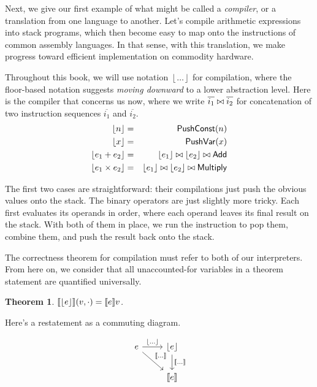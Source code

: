 \documentclass{amsbook}
\newtheorem{theorem}{Theorem}[chapter]
\theoremstyle{definition}
\theoremstyle{remark}
\numberwithin{section}{chapter}
\numberwithin{equation}{chapter}
\begin{document}
Next, we give our first example of what might be called a \emph{compiler}, or a translation from one language to another.
Let's compile arithmetic expressions into stack programs, which then become easy to map onto the instructions of common assembly languages.
In that sense, with this translation, we make progress toward efficient implementation on commodity hardware.

\newcommand{\compile}[1]{{\left \lfloor #1 \right \rfloor}}

Throughout this book, we will use notation $\compile{\ldots}$ for compilation, where the floor-based notation suggests \emph{moving downward} to a lower abstraction level.
Here is the compiler that concerns us now, where we write $\overline{i_1} \bowtie \overline{i_2}$ for concatenation of two instruction sequences $\overline{i_1}$ and $\overline{i_2}$.
\encoding
\begin{eqnarray*}
  \compile{n} &=& \mathsf{PushConst}(n) \\
  \compile{x} &=& \mathsf{PushVar}(x) \\
  \compile{e_1 + e_2} &=& \concat{\compile{e_1}}{\concat{\compile{e_2}}{\mathsf{Add}}} \\
  \compile{e_1 \times e_2} &=& \concat{\compile{e_1}}{\concat{\compile{e_2}}{\mathsf{Multiply}}}
\end{eqnarray*}

The first two cases are straightforward: their compilations just push the obvious values onto the stack.
The binary operators are just slightly more tricky.
Each first evaluates its operands in order, where each operand leaves its final result on the stack.
With both of them in place, we run the instruction to pop them, combine them, and push the result back onto the stack.

The correctness theorem for compilation must refer to both of our interpreters.
From here on, we consider that all unaccounted-for variables in a theorem statement are quantified universally.

\begin{theorem}
  $\denote{\compile{e}}(v, \cdot) = \denote{e}v$.
\end{theorem}

Here's a restatement as a commuting diagram.

\[
\begin{tikzcd}
e \arrow{r}{\compile{\ldots}} \arrow{dr}{\denote{\ldots}} & \compile{e} \arrow{d}{\denote{\ldots}} \\
& \denote{e}
\end{tikzcd}
\]
\end{document}
